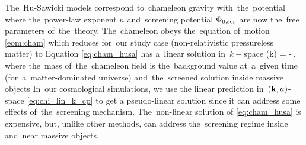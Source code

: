 The~Hu-Sawicki models correspond to~chameleon gravity with~the~potential
where the~power-law exponent $n$ and~screening potential $\Phi_{0,\text{\scriptsize scr}}$ are now the~free parameters of~the~theory.%
The~chameleon obeys the~equation of~motion \eqref{eom:cham} which reduces for~our study case (non-relativistic pressureless matter) to
Equation \eqref{eq:cham_husa} has a~linear solution in~$k-$space
\eq
{
\label{eq:chi_lin_k_cp}
	\hat{\chi}(k) = -\,.
}
where the~mass of~the~chameleon field is
the~background value at~a~given time (for~a~matter-dominated universe)
and~the~screened solution inside massive objects
In~our cosmological simulations, we use the linear prediction in~$(\mathbf k, a)$-space \eqref{eq:chi_lin_k_cp} to get a pseudo-linear solution since it can address some effects of~the~screening mechanism. The~non-linear solution of \eqref{eq:cham_husa} is expensive, but, unlike other methods, can address the~screening regime inside and~near massive objects.
